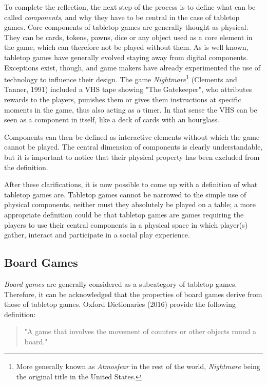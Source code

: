 To complete the reflection, the next step of the process is to define what can be called \textit{components}, and why they have to be central in the case of tabletop games. 
Core components of tabletop games are generally thought as physical. They can be cards, tokens, pawns, dice or any object used as a core element in the game, which can therefore not be played without them. As is well known, tabletop games have generally evolved staying away from digital components. 
Exceptions exist, though, and game makers have already experimented the use of technology to influence their design. The game \textit{Nightmare}\footnote{More generally known as \textit{Atmosfear} in the rest of the world, \textit{Nightmare} being the original title in the United States.}
(Clements and Tanner, 1991) \cite{game:atmo} included a VHS tape showing "The Gatekeeper", who attributes rewards to the players, punishes them or gives them instructions at specific moments in the game, thus also acting as a timer. In that sense the VHS can be seen as a component in itself, like a deck of cards with an hourglass.

Components can then be defined as interactive elements without which the game cannot be played. The central dimension of components is clearly understandable, but it is important to notice that their physical property has been excluded from the definition.

After these clarifications, it is now possible to come up with a definition of what tabletop games are. Tabletop games cannot be narrowed to the simple use of physical components, neither must they absolutely be played on a table; a more appropriate definition could be that tabletop games are games requiring the players to use their central components in a physical space in which player(s) gather, interact and participate in a social play experience. 

\subsection{Board Games}
\textit{Board games} are generally considered as a subcategory of tabletop games. Therefore, it can be acknowledged that the properties of board games derive from those of tabletop games. Oxford Dictionaries (2016) \cite{web:oxford} provide the following definition:

\begin{quotation}
"A game that involves the movement of counters or other objects round a board."
\end{quotation}

